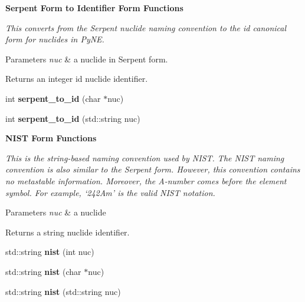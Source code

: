 \begin{Indent}{\bf Serpent Form to Identifier Form Functions}\par
{\em This converts from the Serpent nuclide naming convention to the id canonical form for nuclides in Py\+N\+E. 
\begin{DoxyParams}{Parameters}
{\em nuc} & a nuclide in Serpent form. \\
\hline
\end{DoxyParams}
\begin{DoxyReturn}{Returns}
an integer id nuclide identifier. 
\end{DoxyReturn}
}\begin{DoxyCompactItemize}
\item 
\hypertarget{namespacepyne_1_1nucname_a1be6b404ba5ab52cb51a8cfb91d2a771}{int {\bfseries serpent\+\_\+to\+\_\+id} (char $\ast$nuc)}\label{namespacepyne_1_1nucname_a1be6b404ba5ab52cb51a8cfb91d2a771}

\item 
\hypertarget{namespacepyne_1_1nucname_a23cb9b915047f2aac156e9c102f96fc7}{int {\bfseries serpent\+\_\+to\+\_\+id} (std\+::string nuc)}\label{namespacepyne_1_1nucname_a23cb9b915047f2aac156e9c102f96fc7}

\end{DoxyCompactItemize}
\end{Indent}
\begin{Indent}{\bf N\+I\+S\+T Form Functions}\par
{\em This is the string-\/based naming convention used by N\+I\+S\+T. The N\+I\+S\+T naming convention is also similar to the Serpent form. However, this convention contains no metastable information. Moreover, the A-\/number comes before the element symbol. For example, ‘242\+Am’ is the valid N\+I\+S\+T notation. 
\begin{DoxyParams}{Parameters}
{\em nuc} & a nuclide \\
\hline
\end{DoxyParams}
\begin{DoxyReturn}{Returns}
a string nuclide identifier. 
\end{DoxyReturn}
}\begin{DoxyCompactItemize}
\item 
\hypertarget{namespacepyne_1_1nucname_ab7a6f2f0459c253bc311fbbd62e00a38}{std\+::string {\bfseries nist} (int nuc)}\label{namespacepyne_1_1nucname_ab7a6f2f0459c253bc311fbbd62e00a38}

\item 
\hypertarget{namespacepyne_1_1nucname_aad9752957663fcaa432707c34d414659}{std\+::string {\bfseries nist} (char $\ast$nuc)}\label{namespacepyne_1_1nucname_aad9752957663fcaa432707c34d414659}

\item 
\hypertarget{namespacepyne_1_1nucname_aa4c79af1530cdae7db618209167d17da}{std\+::string {\bfseries nist} (std\+::string nuc)}\label{namespacepyne_1_1nucname_aa4c79af1530cdae7db618209167d17da}

\end{DoxyCompactItemize}
\end{Indent}
